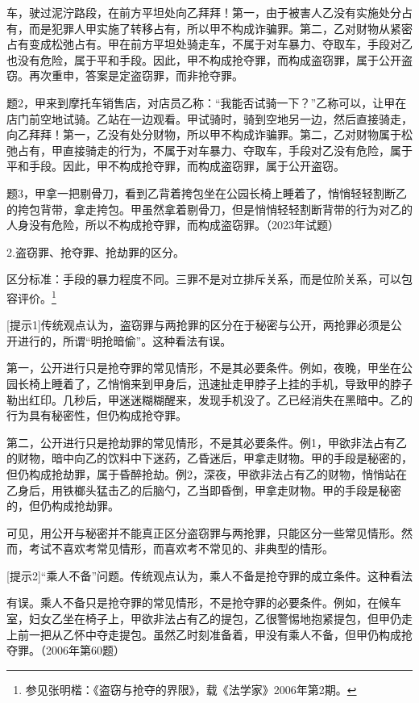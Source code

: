 车，驶过泥泞路段，在前方平坦处向乙拜拜！第一，由于被害人乙没有实施处分占有，而是犯罪人甲实施了转移占有，所以甲不构成诈骗罪。第二，乙对财物从紧密占有变成松弛占有。甲在前方平坦处骑走车，不属于对车暴力、夺取车，手段对乙也没有危险，属于平和手段。因此，甲不构成抢夺罪，而构成盗窃罪，属于公开盗窃。再次重申，答案是定盗窃罪，而非抢夺罪。

题2，甲来到摩托车销售店，对店员乙称：“我能否试骑一下？”乙称可以，让甲在店门前空地试骑。乙站在一边观看。甲试骑时，骑到空地另一边，然后直接骑走，向乙拜拜！第一，乙没有处分财物，所以甲不构成诈骗罪。第二，乙对财物属于松弛占有，甲直接骑走的行为，不属于对车暴力、夺取车，手段对乙没有危险，属于平和手段。因此，甲不构成抢夺罪，而构成盗窃罪，属于公开盗窃。

题3，甲拿一把剔骨刀，看到乙背着挎包坐在公园长椅上睡着了，悄悄轻轻割断乙的挎包背带，拿走挎包。甲虽然拿着剔骨刀，但是悄悄轻轻割断背带的行为对乙的人身没有危险，所以不构成抢夺罪，而构成盗窃罪。（2023年试题）

2.盗窃罪、抢夺罪、抢劫罪的区分。

区分标准：手段的暴力程度不同。三罪不是对立排斥关系，而是位阶关系，可以包容评价。\footnote{参见张明楷：《盗窃与抢夺的界限》，载《法学家》2006年第2期。}


[提示1]传统观点认为，盗窃罪与两抢罪的区分在于秘密与公开，两抢罪必须是公开进行的，所谓“明抢暗偷”。这种看法有误。

第一，公开进行只是抢夺罪的常见情形，不是其必要条件。例如，夜晚，甲坐在公园长椅上睡着了，乙悄悄来到甲身后，迅速扯走甲脖子上挂的手机，导致甲的脖子勒出红印。几秒后，甲迷迷糊糊醒来，发现手机没了。乙已经消失在黑暗中。乙的行为具有秘密性，但仍构成抢夺罪。

第二，公开进行只是抢劫罪的常见情形，不是其必要条件。例1，甲欲非法占有乙的财物，暗中向乙的饮料中下迷药，乙昏迷后，甲拿走财物。甲的手段是秘密的，但仍构成抢劫罪，属于昏醉抢劫。例2，深夜，甲欲非法占有乙的财物，悄悄站在乙身后，用铁榔头猛击乙的后脑勺，乙当即昏倒，甲拿走财物。甲的手段是秘密的，但仍构成抢劫罪。

可见，用公开与秘密并不能真正区分盗窃罪与两抢罪，只能区分一些常见情形。然而，考试不喜欢考常见情形，而喜欢考不常见的、非典型的情形。

[提示2]“乘人不备”问题。传统观点认为，乘人不备是抢夺罪的成立条件。这种看法

有误。乘人不备只是抢夺罪的常见情形，不是抢夺罪的必要条件。例如，在候车室，妇女乙坐在椅子上，甲欲非法占有乙的提包，乙很警惕地抱紧提包，但甲仍走上前一把从乙怀中夺走提包。虽然乙时刻准备着，甲没有乘人不备，但甲仍构成抢夺罪。（2006年第60题）

